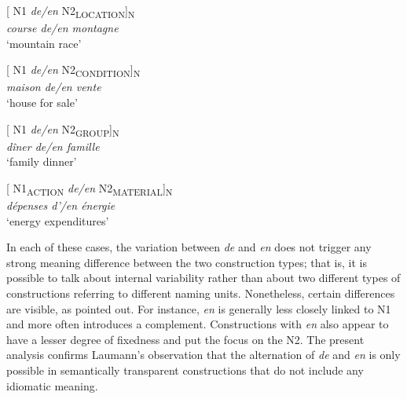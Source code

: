 \documentclass[output=paper]{langsci/langscibook}
\begin{document}
\begin{exe}\ex\begin{minipage}[t]{0.4\textwidth}    %
[ N1 \textit{de/en} N2\textsubscript{LOCATION}]\textsubscript{N}\\
\textit{course de/en montagne}\\
`mountain race'
\end{minipage}\hfill%
\begin{minipage}[t]{0.45\textwidth}
[ N1 \textit{de/en} N2\textsubscript{CONDITION}]\textsubscript{N}\\
\textit{maison de/en vente}\\
`house for sale'
\end{minipage}
\end{exe}

\begin{exe}\ex\begin{minipage}[t]{0.4\textwidth}    %
[ N1 \textit{de/en} N2\textsubscript{GROUP}]\textsubscript{N}\\
\textit{dîner de/en famille}\\
`family dinner'
\end{minipage}\hfill            %
\begin{minipage}[t]{0.45\textwidth}
[ N1\textsubscript{ACTION} \textit{de/en} N2\textsubscript{MATERIAL}]\textsubscript{N}\\
\textit{dépenses d'/en énergie }\\
`energy expenditures'
\end{minipage}
\end{exe}

In each of these cases, the variation between \textit{de} and \textit{en} does not trigger any strong meaning difference between the two construction types; that is, it is possible to talk about internal variability rather than about two different types of constructions referring to different naming units. Nonetheless, certain differences are visible, as \citet{Laumann:1998} pointed out. For instance, \textit{en} is generally less closely linked to N1 and more often introduces a complement. Constructions with \textit{en} also appear to have a lesser degree of fixedness and put the focus on the N2. The present analysis confirms Laumann’s observation that the alternation of \textit{de} and \textit{en} is only possible in semantically transparent constructions that do not include any idiomatic meaning.  
\end{document}
